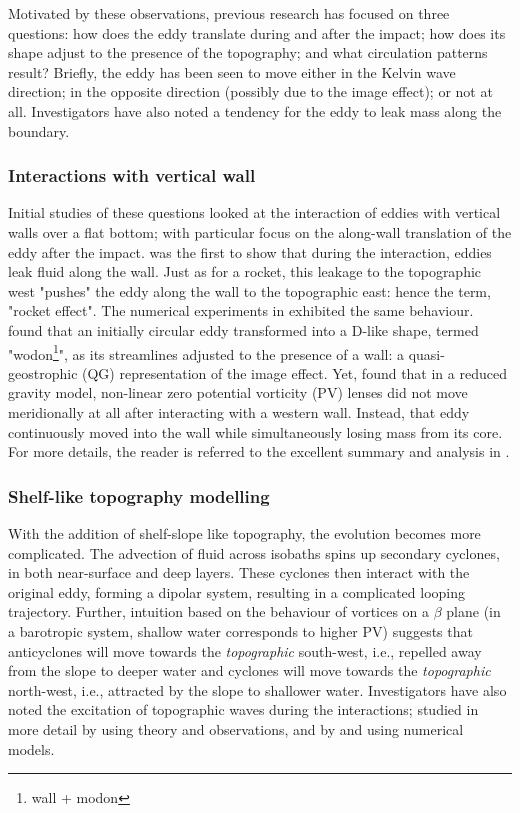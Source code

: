 Motivated by these observations, previous research has focused on three questions: how does the eddy translate during and after the impact; how does its shape adjust to the presence of the topography; and what circulation patterns result? Briefly, the eddy has been seen to move either in the Kelvin wave direction; in the opposite direction (possibly due to the image effect); or not at all. Investigators have also noted a tendency for the eddy to leak mass along the boundary.

\subsubsection*{Interactions with vertical wall}
\label{sec-1-2-1}
\label{sec:introwall}
Initial studies of these questions looked at the interaction of eddies with vertical walls over a flat bottom; with particular focus on the along-wall translation of the eddy after the impact. \citet{Nof1988} was the first to show that during the interaction, eddies leak fluid along the wall. Just as for a rocket, this leakage to the topographic west "pushes" the eddy along the wall to the topographic east: hence the term, "rocket effect". The numerical experiments in \citet{Shi1993} exhibited the same behaviour. \citet{Shi1994} found that an initially circular eddy transformed into a D-like shape, termed "wodon\footnote{wall + modon}", as its streamlines adjusted to the presence of a wall: a quasi-geostrophic (QG) representation of the image effect. Yet, \citet{Nof1999} found that in a reduced gravity model, non-linear zero potential vorticity (PV) lenses did not move meridionally at all after interacting with a western wall. Instead, that eddy continuously moved into the wall while simultaneously losing mass from its core. For more details, the reader is referred to the excellent summary and analysis in \citet{Nof1999}.
\subsubsection*{Shelf-like topography modelling}
\label{sec-1-2-2}
\label{sec:introshelf}
With the addition of shelf-slope like topography, the evolution becomes more complicated. The advection of fluid across isobaths spins up secondary cyclones, in both near-surface and deep layers. These cyclones then interact with the original eddy, forming a dipolar system, resulting in a complicated looping trajectory. Further, intuition based on the behaviour of vortices on a $β$ plane (in a barotropic system, shallow water corresponds to higher PV) suggests that anticyclones will move towards the \emph{topographic} south-west, i.e., repelled away from the slope to deeper water and cyclones will move towards the \emph{topographic} north-west, i.e., attracted by the slope to shallower water. Investigators have also noted the excitation of topographic waves during the interactions; studied in more detail by \citet{Louis1982} using theory and observations, and by \citet{Shaw1991} and \citet{Wang1992} using numerical models.

